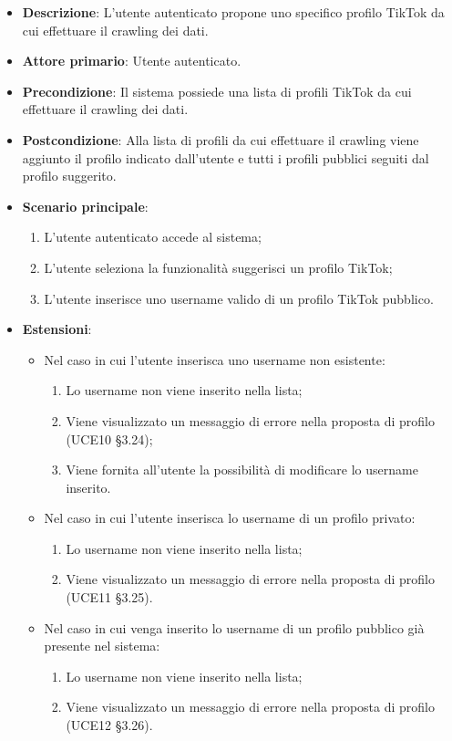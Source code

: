 \begin{itemize}
	\item \textbf{Descrizione}: L'utente autenticato propone uno specifico profilo TikTok da cui effettuare il crawling dei dati.
    \item \textbf{Attore primario}: Utente autenticato.
    \item \textbf{Precondizione}: Il sistema possiede una lista di profili TikTok da cui effettuare il crawling dei dati.
    \item \textbf{Postcondizione}: Alla lista di profili da cui effettuare il crawling viene aggiunto il profilo indicato dall’utente e tutti i profili pubblici seguiti dal profilo suggerito.
    \item \textbf{Scenario principale}: 
    \begin{enumerate}
        \item L'utente autenticato accede al sistema;
        \item L’utente seleziona la funzionalità suggerisci un profilo TikTok;
        \item L’utente inserisce uno username valido di un profilo TikTok pubblico.
    \end{enumerate}
    \item \textbf{Estensioni}:
    \begin{itemize}
        \item Nel caso in cui l’utente inserisca uno username non esistente:
        \begin{enumerate}
            \item Lo username non viene inserito nella lista;
            \item Viene visualizzato un messaggio di errore nella proposta di profilo (UCE10 §3.24);
            \item Viene fornita all’utente la possibilità di modificare lo username inserito.
        \end{enumerate}
        \item Nel caso in cui l’utente inserisca lo username di un profilo privato:
        \begin{enumerate}
            \item Lo username non viene inserito nella lista;
            \item Viene visualizzato un messaggio di errore nella proposta di profilo (UCE11 §3.25).
        \end{enumerate}
        \item Nel caso in cui venga inserito lo username di un profilo pubblico già presente nel sistema:
        \begin{enumerate}
            \item Lo username non viene inserito nella lista;
            \item Viene visualizzato un messaggio di errore nella proposta di profilo (UCE12 §3.26).
        \end{enumerate} 
    \end{itemize}
\end{itemize}

\pagebreak